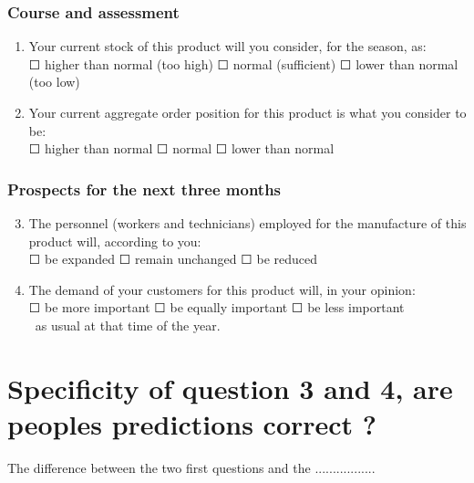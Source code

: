 \documentclass[12pt,a4paper,oneside]{book}
\begin{document}
\subsubsection*{Course and assessment}
\begin{enumerate}
    \item Your current stock of this product will you consider, for the season, as: \\
    $\Square$ higher than normal (too high) $\Square$ normal (sufficient) $\Square$ lower than normal (too low)
    
    \item Your current aggregate order position for this product is what you consider to be: \\
    $\Square$ higher than normal $\Square$ normal $\Square$ lower than normal
\end{enumerate}

\subsubsection*{Prospects for the next three months} 
\begin{enumerate}
\setcounter{enumi}{2}
    \item The personnel (workers and technicians) employed for the manufacture of this product will, according to you: \\
    $\Square$ be expanded $\Square$ remain unchanged $\Square$ be reduced
                        
    \item The demand of your customers for this product will, in your opinion:  \\
    $\Square$ be more important $\Square$ be equally important $\Square$ be less important \\\    
    as usual at that time of the year.
\end{enumerate}


\newpage
\section*{Specificity of question 3 and 4, are peoples predictions correct ?}

The difference between the two first questions and the .................
\end{document}
